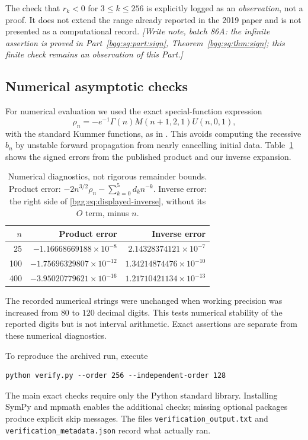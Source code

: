\documentclass[11pt,a4paper]{article}
\numberwithin{equation}{section}
\theoremstyle{definition}
\theoremstyle{remark}
\theoremstyle{definition}
\begin{document}
The check that $r_k<0$ for $3\le k\le256$ is explicitly logged as an
\emph{observation}, not a proof. It does not extend the range already reported
in the 2019 paper and is not presented as a computational record.
\emph{[Write note, batch 86A: the infinite assertion is proved in
Part~\ref{bgg:sg:part:sign}, Theorem~\ref{bgg:sg:thm:sign}; this finite
check remains an observation of this Part.]}

\subsection{Numerical asymptotic checks}

For numerical evaluation we used the exact special-function expression
\begin{equation}\label{bgg:eq:kummer-numerical}
 \rho_n=-e^{-1}\Gamma(n)M(n+1,2,1)U(n,0,1),
\end{equation}
with the standard Kummer functions, as in \cite{BGG}. This avoids computing
the recessive $b_n$ by unstable forward propagation from nearly cancelling
initial data. Table~\ref{bgg:tab:numerical} shows the signed errors from the
published product and our inverse expansion.

\begin{table}[ht]
\centering
\caption{Numerical diagnostics, not rigorous remainder bounds. Product error:
$-2n^{3/2}\rho_n-\sum_{k=0}^{5}d_kn^{-k}$. Inverse error: the right side of
\eqref{bgg:eq:displayed-inverse}, without its $O$ term, minus $n$.}
\label{bgg:tab:numerical}
\begin{tabular}{r r r}
\toprule
$n$ & Product error & Inverse error\\
\midrule
25 & $-1.16668669188\times10^{-8}$ & $2.14328374121\times10^{-7}$\\
100 & $-1.75696329807\times10^{-12}$ & $1.34214874476\times10^{-10}$\\
400 & $-3.95020779621\times10^{-16}$ & $1.21710421134\times10^{-13}$\\
\bottomrule
\end{tabular}
\end{table}

The recorded numerical strings were unchanged when working precision was
increased from $80$ to $120$ decimal digits. This tests numerical stability
of the reported digits but is not interval arithmetic. Exact assertions are
separate from these numerical diagnostics.

To reproduce the archived run, execute
\begin{verbatim}
python verify.py --order 256 --independent-order 128
\end{verbatim}
The main exact checks require only the Python standard library. Installing
SymPy and mpmath enables the additional checks; missing optional packages
produce explicit skip messages. The files \texttt{verification\_output.txt}
and \texttt{verification\_metadata.json} record what actually ran.
\end{document}
